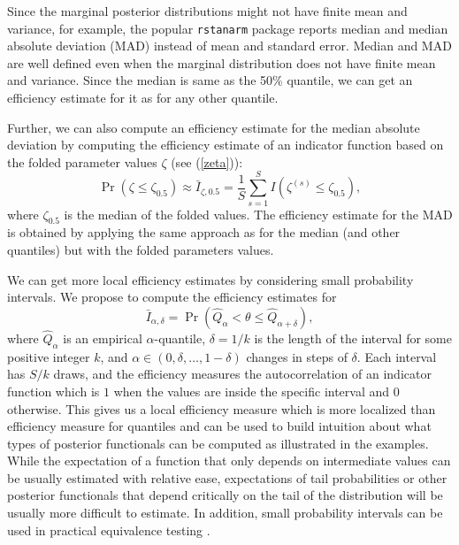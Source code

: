 \documentclass[american,]{article}
\theoremstyle{definition}
\begin{document}
Since the marginal posterior distributions might not have finite mean
and variance, for example, the popular \texttt{rstanarm} package
\citep{RStanARM.2.17} reports median and median absolute deviation (MAD)
instead of mean and standard error. Median and MAD are well defined
even when the marginal distribution does not have finite mean and
variance. Since the median is same as the 50\% quantile, we can get an
efficiency estimate for it as for any other quantile.

Further, we can also compute an efficiency estimate for the median
absolute deviation by computing the efficiency estimate of an
indicator function based on the folded parameter values \(\zeta\) (see
(\ref{zeta})):
\begin{equation}
\Pr(\zeta \leq \zeta_{0.5}) \approx \bar{I}_{\zeta,0.5} = \frac{1}{S}\sum_{s=1}^S
I(\zeta^{(s)} \leq \zeta_{0.5}),
\end{equation}
where \(\zeta_{0.5}\) is the median of the folded values. The efficiency estimate for the MAD is obtained by applying the same
approach as for the median (and other quantiles) but with the folded
parameters values.

We can get more local efficiency estimates by considering small
probability intervals. We propose to compute the efficiency estimates
for
\begin{equation}
\bar{I}_{\alpha,\delta} = \Pr(\hat{Q}_\alpha < \theta \leq \hat{Q}_{\alpha+\delta}),
\end{equation}
where \(\hat{Q}_\alpha\) is an empirical \(\alpha\)-quantile,
\(\delta=1/k\) is the length of the interval for some positive integer
\(k\), and \(\alpha \in (0,\delta,\ldots,1-\delta)\) changes in steps of
\(\delta\). Each interval has \(S/k\) draws, and the efficiency measures
the autocorrelation of an indicator function which is \(1\) when the
values are inside the specific interval and \(0\) otherwise. This
gives us a local efficiency measure which is more localized than
efficiency measure for quantiles and can be used to build intuition
about what types of posterior functionals can be computed as
illustrated in the examples. While the expectation of a function that
only depends on intermediate values can be usually estimated with relative
ease, expectations of tail probabilities or other posterior
functionals that depend critically on the tail of the
distribution will be usually more difficult to estimate. In addition, small
probability intervals can be used in practical equivalence testing
\citep[see, e.g.,][]{Wellek:2010:testing}.
\end{document}
